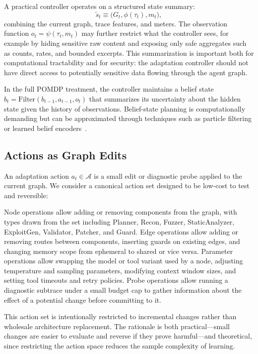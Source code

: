 \documentclass[sigconf,anonymous]{acmart}
\begin{document}
A practical controller operates on a structured state summary:
\begin{equation}
\label{eq:state}
\tilde{s}_t \equiv \big(G_t, \phi(\tau_t), m_t\big),
\end{equation}
combining the current graph, trace features, and meters. The observation function $o_t = \psi(\tau_t, m_t)$ may further restrict what the controller sees, for example by hiding sensitive raw content and exposing only safe aggregates such as counts, rates, and bounded excerpts. This summarization is important both for computational tractability and for security: the adaptation controller should not have direct access to potentially sensitive data flowing through the agent graph.

In the full POMDP treatment, the controller maintains a belief state $b_t = \text{Filter}(b_{t-1}, a_{t-1}, o_t)$ that summarizes its uncertainty about the hidden state given the history of observations. Belief-state planning is computationally demanding but can be approximated through techniques such as particle filtering or learned belief encoders~\cite{kaelbling1998pomdp,silver2010pomcp}.

\subsection{Actions as Graph Edits}

An adaptation action $a_t \in \mathcal{A}$ is a small edit or diagnostic probe applied to the current graph. We consider a canonical action set designed to be low-cost to test and reversible:

Node operations allow adding or removing components from the graph, with types drawn from the set including Planner, Recon, Fuzzer, StaticAnalyzer, ExploitGen, Validator, Patcher, and Guard. Edge operations allow adding or removing routes between components, inserting guards on existing edges, and changing memory scope from ephemeral to shared or vice versa. Parameter operations allow swapping the model or tool variant used by a node, adjusting temperature and sampling parameters, modifying context window sizes, and setting tool timeouts and retry policies. Probe operations allow running a diagnostic subtrace under a small budget cap to gather information about the effect of a potential change before committing to it.

This action set is intentionally restricted to incremental changes rather than wholesale architecture replacement. The rationale is both practical---small changes are easier to evaluate and reverse if they prove harmful---and theoretical, since restricting the action space reduces the sample complexity of learning.
\end{document}
